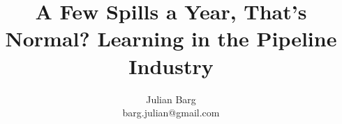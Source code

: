 \documentclass[12pt, man, natbib]{apa6}
\title{A Few Spills a Year, That's Normal? Learning in the Pipeline Industry}
\author{Julian Barg\\barg.julian@gmail.com}
\affiliation{Ivey Business School}
\begin{document}
	
	\maketitle
	
	\singlespacing
	
	
	
	
	
	

	


\end{document}
